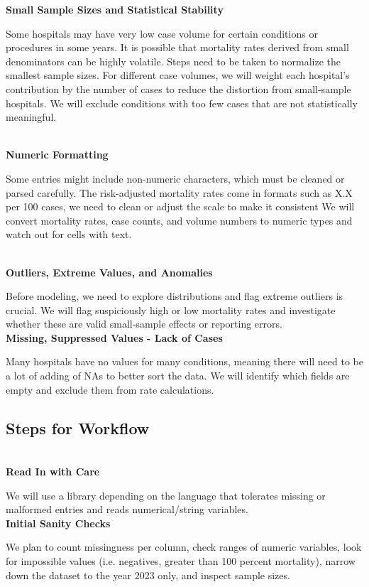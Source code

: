 \documentclass{article}
\theoremstyle{plain}
\theoremstyle{definition}
\theoremstyle{remark}
\begin{document}
\textbf{Small Sample Sizes and Statistical Stability } 

Some hospitals may have very low case volume for certain conditions or procedures in some years. It is possible that mortality rates derived from small denominators can be highly volatile. Steps need to be taken to normalize the smallest sample sizes. For different case volumes, we will weight each hospital’s contribution by the number of cases to reduce the distortion from small-sample hospitals. We will exclude conditions with too few cases that are not statistically meaningful.

\\ \textbf {Numeric Formatting}

Some entries might include non-numeric characters, which must be cleaned or parsed carefully. 
The risk-adjusted mortality rates come in formats such as X.X per 100 cases, we need to clean or adjust the scale to make it consistent 
We will convert mortality rates, case counts, and volume numbers to numeric types and watch out for cells with text.

\\ \textbf{Outliers, Extreme Values, and Anomalies}

Before modeling, we need to explore distributions and flag extreme outliers is crucial.
We will flag suspiciously high or low mortality rates and investigate whether these are valid small-sample effects or reporting errors.\\

\textbf{Missing, Suppressed Values - Lack of Cases} 

Many hospitals have no values for many conditions, meaning there will need to be a lot of adding of NAs to better sort the data. We will identify which fields are empty and exclude them from rate calculations.

\subsection{Steps for Workflow} \\ \textbf{Read In with Care} 

We will use a library depending on the language that tolerates missing or malformed entries and reads numerical/string variables. \\

\textbf{Initial Sanity Checks} 

We plan to count missingness per column, check ranges of numeric variables, look for impossible values (i.e. negatives, greater than 100 percent mortality), narrow down the dataset to the year 2023 only, and inspect sample sizes. 
\end{document}
